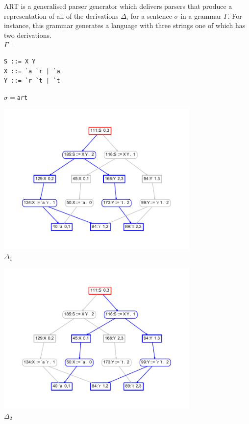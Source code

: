 \makecstitle
\thispagestyle{empty}
{\sf
\noindent
ART is a generalised parser generator which delivers parsers that produce a representation of all of the derivations $\Delta_i$ for a sentence $\sigma$ in a grammar $\Gamma$. For instance, this grammar generates a language with three strings one of which has two derivations.\\[1ex]
}
\noindent$\Gamma$ = 
\begin{verbatim}
S ::= X Y
X ::= `a `r | `a
Y ::= `r `t | `t
\end{verbatim}
$\sigma=${\tt art}
\hspace*{-4cm}
\parbox{10cm}{\includegraphics[width=10cm]{logo1.pdf}\\\hspace*{5.1cm}$\Delta_1$}
\parbox{10cm}{\includegraphics[width=10cm]{logo2.pdf}\\\hspace*{5.1cm}$\Delta_2$}\\[3ex]
